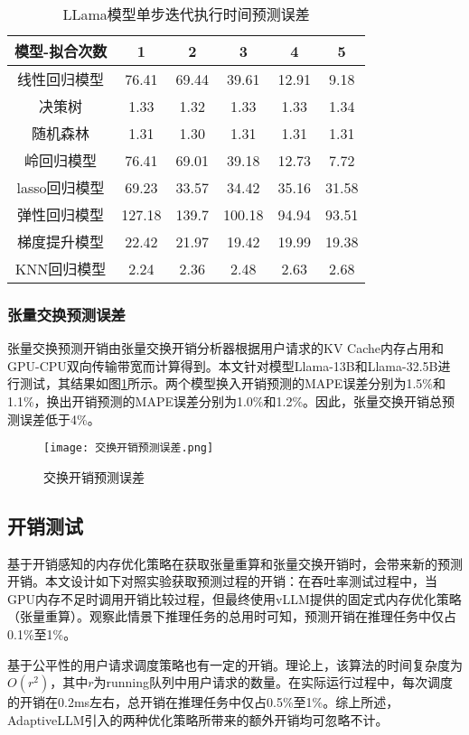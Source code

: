 \begin{table}[H]
  \centering
  \caption{LLama模型单步迭代执行时间预测误差}
  \label{Table:LLama模型单步迭代执行时间预测误差}
  \renewcommand{\arraystretch}{1.25}
  \small
  \begin{tabular}{c c c c c c}
    \toprule
    \textbf{模型-拟合次数} & \textbf{1} & \textbf{2} & \textbf{3} & \textbf{4} & \textbf{5} \\
    \midrule
    线性回归模型 & 76.41 & 69.44 & 39.61 & 12.91 & 9.18 \\ 
    决策树 & 1.33 & 1.32 & 1.33 & 1.33 & 1.34 \\ 
    随机森林 & 1.31 & 1.30 & 1.31 & 1.31 & 1.31 \\ 
    岭回归模型 & 76.41 & 69.01 & 39.18 & 12.73 & 7.72 \\ 
    lasso回归模型 & 69.23 & 33.57 & 34.42 & 35.16 & 31.58  \\ 
    弹性回归模型 & 127.18 & 139.7 & 100.18 & 94.94 & 93.51  \\ 
    梯度提升模型 & 22.42 & 21.97 & 19.42 & 19.99 & 19.38  \\ 
    KNN回归模型 & 2.24 & 2.36 & 2.48 & 2.63 & 2.68 \\ 
    \bottomrule
  \end{tabular}
\end{table}

\subsubsection{张量交换预测误差}

张量交换预测开销由张量交换开销分析器根据用户请求的KV Cache内存占用和GPU-CPU双向传输带宽而计算得到。本文针对模型Llama-13B和Llama-32.5B进行测试，其结果如图\ref{Fig:交换开销预测误差}所示。两个模型换入开销预测的MAPE误差分别为1.5\%和1.1\%，换出开销预测的MAPE误差分别为1.0\%和1.2\%。因此，张量交换开销总预测误差低于4\%。

\begin{figure}[!htbp]
  \centering
  \texttt{[image: 交换开销预测误差.png]}
  \caption{交换开销预测误差}
  \label{Fig:交换开销预测误差}
\end{figure}

\subsection{开销测试}

基于开销感知的内存优化策略在获取张量重算和张量交换开销时，会带来新的预测开销。本文设计如下对照实验获取预测过程的开销：在吞吐率测试过程中，当GPU内存不足时调用开销比较过程，但最终使用vLLM提供的固定式内存优化策略（张量重算）。观察此情景下推理任务的总用时可知，预测开销在推理任务中仅占0.1\%至1\%。

基于公平性的用户请求调度策略也有一定的开销。理论上，该算法的时间复杂度为$O(r^2)$，其中$r$为running队列中用户请求的数量。在实际运行过程中，每次调度的开销在0.2ms左右，总开销在推理任务中仅占0.5\%至1\%。综上所述，AdaptiveLLM引入的两种优化策略所带来的额外开销均可忽略不计。
